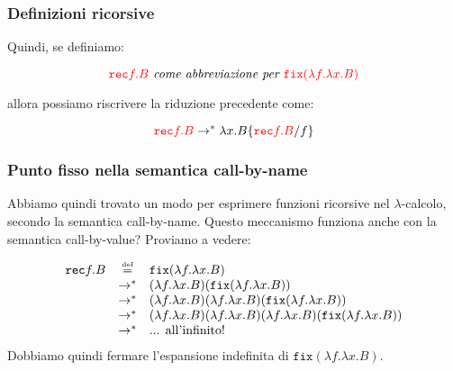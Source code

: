 \subsubsection{Definizioni ricorsive}
Quindi, se definiamo:

\[\textcolor{red}{\texttt{rec} f.B} \textit{ come abbreviazione per }
\textcolor{red}{\texttt{fix}(\lambda f.\lambda x.B)}\]

allora possiamo riscrivere la riduzione precedente come:

\[
    \textcolor{red}{\texttt{rec} f.B} \rightarrow^* \lambda x.B\{\textcolor{red}{\texttt{rec} f.B}/f\}
\]
\subsubsection{Punto fisso nella semantica call-by-name}
Abbiamo quindi trovato un modo per esprimere funzioni ricorsive nel $\lambda$-calcolo,
secondo la semantica call-by-name. Questo meccanismo funziona anche con la semantica
call-by-value? Proviamo a vedere:

\[
\begin{array}{lcl}
    \texttt{rec} f.B & \defeq & \texttt{fix}(\lambda f.\lambda x.B) \\
    & \rightarrow^* & (\lambda f.\lambda x.B)(\texttt{fix}(\lambda f.\lambda x.B)) \\
    & \rightarrow^* & (\lambda f.\lambda x.B)(\lambda f.\lambda x.B)(\texttt{fix}(\lambda f.\lambda x.B)) \\
    & \rightarrow^* & (\lambda f.\lambda x.B)(\lambda f.\lambda x.B)(\lambda f.\lambda x.B)(\texttt{fix}(\lambda f.\lambda x.B)) \\
    & \rightarrow^* & \text{... all'infinito!} \\
\end{array}
\]
Dobbiamo quindi fermare l'espansione indefinita di $\texttt{fix}(\lambda f.\lambda x.B)$.

